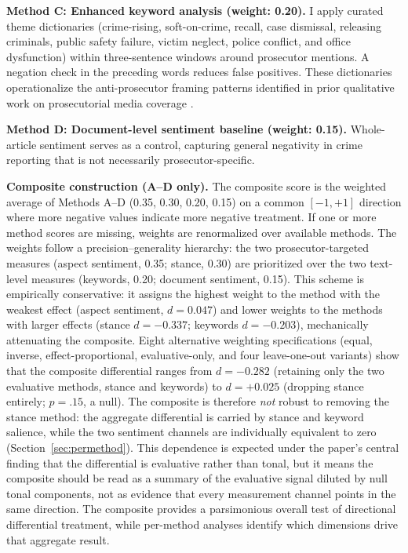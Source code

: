 \documentclass[12pt, letterpaper]{article}
\begin{document}
\textbf{Method C: Enhanced keyword analysis (weight: 0.20).} I apply curated theme dictionaries (crime-rising, soft-on-crime, recall, case dismissal, releasing criminals, public safety failure, victim neglect, police conflict, and office dysfunction) within three-sentence windows around prosecutor mentions. A negation check in the preceding words reduces false positives. These dictionaries operationalize the anti-prosecutor framing patterns identified in prior qualitative work on prosecutorial media coverage \citep{bazelon2019,goldstein2024}.

\textbf{Method D: Document-level sentiment baseline (weight: 0.15).} Whole-article sentiment serves as a control, capturing general negativity in crime reporting that is not necessarily prosecutor-specific.

\textbf{Composite construction (A--D only).} The composite score is the weighted average of Methods A--D (0.35, 0.30, 0.20, 0.15) on a common $[-1,+1]$ direction where more negative values indicate more negative treatment. If one or more method scores are missing, weights are renormalized over available methods. The weights follow a precision--generality hierarchy: the two prosecutor-targeted measures (aspect sentiment, 0.35; stance, 0.30) are prioritized over the two text-level measures (keywords, 0.20; document sentiment, 0.15). This scheme is empirically conservative: it assigns the highest weight to the method with the weakest effect (aspect sentiment, $d = 0.047$) and lower weights to the methods with larger effects (stance $d = -0.337$; keywords $d = -0.203$), mechanically attenuating the composite. Eight alternative weighting specifications (equal, inverse, effect-proportional, evaluative-only, and four leave-one-out variants) show that the composite differential ranges from $d = -0.282$ (retaining only the two evaluative methods, stance and keywords) to $d = +0.025$ (dropping stance entirely; $p = .15$, a null). The composite is therefore \emph{not} robust to removing the stance method: the aggregate differential is carried by stance and keyword salience, while the two sentiment channels are individually equivalent to zero (Section~\ref{sec:permethod}). This dependence is expected under the paper's central finding that the differential is evaluative rather than tonal, but it means the composite should be read as a summary of the evaluative signal diluted by null tonal components, not as evidence that every measurement channel points in the same direction. The composite provides a parsimonious overall test of directional differential treatment, while per-method analyses identify which dimensions drive that aggregate result.
\end{document}
